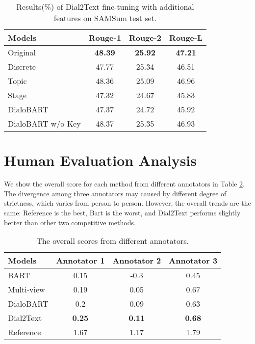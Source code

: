 \begin{table}[h]
	\centering
	\small
	\begin{tabular}{lccc}
		\toprule[1pt]
		\textbf{Models} & \textbf{Rouge-1} & \textbf{Rouge-2} & \textbf{Rouge-L} \\
		\midrule[1pt]
		{Original} &\textbf{48.39} &\textbf{25.92} &\textbf{47.21} \\
		{Discrete} &47.77&25.34& 46.51\\
		{Topic} &48.36&25.09&46.96 \\
		{Stage} &47.32&24.67&45.83  \\
		{DialoBART} &47.37&24.72&45.92 \\
		{DialoBART w/o Key} &48.37&25.35&46.93  \\
		\bottomrule[1pt]
	\end{tabular}
	\caption{Results(\%) of Dial2Text fine-tuning with additional features on SAMSum test set.}
	\label{tab:adddial2text}
\end{table}

\section{Human Evaluation Analysis}

We show the overall score for each method from different annotators in Table \ref{tab:annotator}. The divergence among three annotators may caused by different degree of strictness, which varies from person to person. However, the overall trends are the same: Reference is the best, Bart is the worst, and Dial2Text performs slightly better than other two competitive methods.

\begin{table}[h]
	\centering
	\small
	\begin{tabular}{lccc}
		\toprule[1pt]
		\textbf{Models} & \textbf{Annotator 1} & \textbf{Annotator 2} & \textbf{Annotator 3} \\
		\midrule[1pt]
		BART & 0.15& -0.3&0.45\\
		Multi-view & 0.19& 0.05&0.67 \\
		DialoBART & 0.2& 0.09& 0.63\\
		Dial2Text &\textbf{0.25} &\textbf{0.11} & \textbf{0.68}\\
		\midrule[1pt]
		Reference & 1.67& 1.17&1.79 \\
		\bottomrule[1pt]
	\end{tabular}
	\caption{The overall scores from different annotators.}
	\label{tab:annotator}
\end{table}

